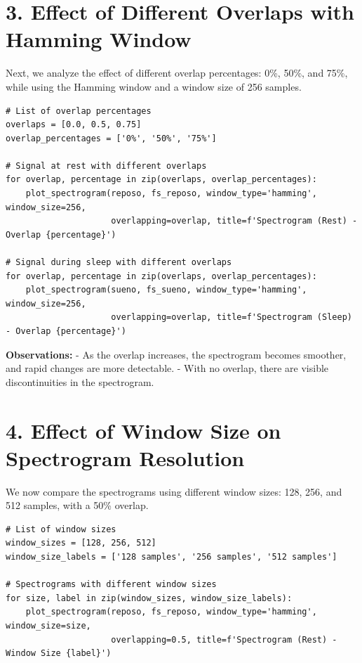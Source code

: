 \documentclass[10pt]{article}
\theoremstyle{definition}
\theoremstyle{remark}
\theoremstyle{definition}
\numberwithin{equation}{prob}
\begin{document}
\section*{3. Effect of Different Overlaps with Hamming Window}

Next, we analyze the effect of different overlap percentages: 0\%, 50\%, and 75\%, while using the Hamming window and a window size of 256 samples.

\begin{lstlisting}[caption=Python code for analyzing different overlap percentages]
# List of overlap percentages
overlaps = [0.0, 0.5, 0.75]
overlap_percentages = ['0%', '50%', '75%']

# Signal at rest with different overlaps
for overlap, percentage in zip(overlaps, overlap_percentages):
    plot_spectrogram(reposo, fs_reposo, window_type='hamming', window_size=256,
                     overlapping=overlap, title=f'Spectrogram (Rest) - Overlap {percentage}')

# Signal during sleep with different overlaps
for overlap, percentage in zip(overlaps, overlap_percentages):
    plot_spectrogram(sueno, fs_sueno, window_type='hamming', window_size=256,
                     overlapping=overlap, title=f'Spectrogram (Sleep) - Overlap {percentage}')
\end{lstlisting}

\textbf{Observations:}
- As the overlap increases, the spectrogram becomes smoother, and rapid changes are more detectable.
- With no overlap, there are visible discontinuities in the spectrogram.

\section*{4. Effect of Window Size on Spectrogram Resolution}

We now compare the spectrograms using different window sizes: 128, 256, and 512 samples, with a 50\% overlap.

\begin{lstlisting}[caption=Python code for analyzing different window sizes]
# List of window sizes
window_sizes = [128, 256, 512]
window_size_labels = ['128 samples', '256 samples', '512 samples']

# Spectrograms with different window sizes
for size, label in zip(window_sizes, window_size_labels):
    plot_spectrogram(reposo, fs_reposo, window_type='hamming', window_size=size,
                     overlapping=0.5, title=f'Spectrogram (Rest) - Window Size {label}')
\end{lstlisting}
\end{document}
